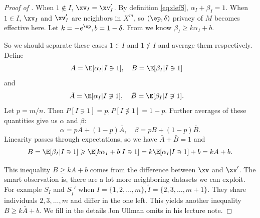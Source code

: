 \begin{proof}[Proof of ]
	When $1\not\in I$, $\xv_I = \xv'_I$. By definition \eqref{eq:defS}, $\alpha_I+\beta_I = 1$.
	When $1\in I$, $\xv_{I}$ and $\xv'_{I}$ are neighbors in $X^m$, so $(\ep,\delta)$ privacy of $M$ becomes effective here. Let $k = -e^\ep, b = 1-\delta$. From  we know $\beta_I\geqslant k\alpha_I+b$.

	So we should separate these cases $1\in I$ and $1\notin I$ and average them respectively.
	Define
	\begin{align*}
		A&=\E[\alpha_I|I\ni 1], %
		\quad
		B=\E[\beta_I|I\ni 1] %
	\end{align*}
	and
	\begin{align*}
		\bar{A}&=\E[\alpha_I|I\not\ni 1] ,%
		\quad
		\bar{B}=\E[\beta_I|I\not\ni 1].%
	\end{align*}
	Let $p=m/n$. Then $P[I\ni 1]=p, P[I\not\ni 1]=1-p$. Further averages of these quantities give us $\alpha$ and $\beta$:
	$$\alpha = pA+(1-p)\bar{A}, \quad \beta = pB+(1-p)\bar{B}.$$
	Linearity passes through expectations, so we have $\bar{A}+\bar{B} = 1$ and
	\[B = \E[\beta_I|I\ni 1] \geqslant \E[k\alpha_I+b|I\ni 1] = k\E[\alpha_I|I\ni 1]+b = kA+b.\]
	



	This inequality $B\geqslant kA+b$ comes from the difference between $\xv$ and $\xv'$. The smart observation is, there are a lot more neighboring datasets we can exploit. For example $S_I$ and $S_{\tilde{I}}'$ when $I = \{1,2,\ldots, m\}, \tilde{I} = \{2,3,\ldots, m+1\}$. They share individuals $2,3,\ldots, m$ and differ in the one left. This yields another inequality $B\geqslant k\bar{A}+b$. We fill in the details Jon Ullman omits in his lecture note.
	

\end{proof}
